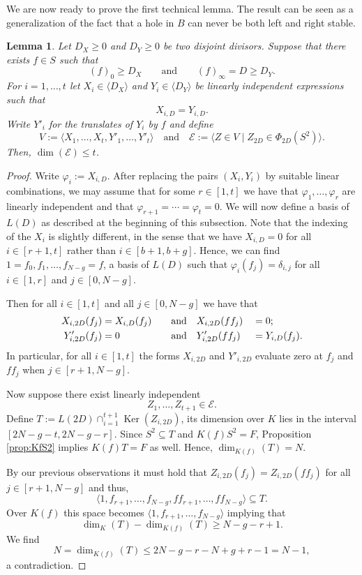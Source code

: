 \documentclass[12pt]{amsart}
\renewcommand{\leq}{\leqslant}
\renewcommand{\geq}{\geqslant}
\DeclareMathOperator{\Ker}{Ker}
\newtheorem{lemma}[theorem]{Lemma}
\theoremstyle{definition}
\newcommand{\divi}[1]{\langle #1 \rangle}
\begin{document}
	We are now ready to prove the first technical lemma. The result can be seen as a generalization of the fact that a hole in $B$ can never be both left and right stable. 
	
	\begin{lemma}\label{lem:dimt1}
		Let $D_X\ge0$ and $D_Y\ge0$ be two disjoint divisors. Suppose that there exists $f\in S$ such that 
		$$(f)_0\ge D_X \qquad\text{and}\qquad (f)_\infty=D \ge D_Y .$$ 
		For $i=1,\ldots,t$ let $X_i\in \divi{D_X}$ and $Y_i\in \divi{D_Y}$ be linearly independent expressions such that $$X_{i,D}=Y_{i,D}.$$ Write $Y'_i$ for the translates of $Y_i$ by $f$ and define 
		$$ V:=\langle X_{1},\ldots,X_{t},Y'_{1},\ldots,Y'_{t}\rangle\quad \text{and}\quad \mathcal E:=\langle Z\in V \mid Z_{2D}\in \Phi_{2D}(S^2)\rangle.$$ Then, $\dim (\mathcal E)\le t$. 
	\end{lemma}
	\begin{proof}
		
		Write $\varphi_i := X_{i,D}$. After replacing the pairs $(X_i,Y_i)$ by suitable linear combinations, we may assume that for some $r \in [1, t]$ we have that $\varphi_1,\ldots,\varphi_r$ are linearly independent and that $\varphi_{r+1}=\cdots=\varphi_t=0.$ We will now define a basis of $L(D)$ as described at the beginning of this subsection. Note that the indexing of the $X_i$ is slightly different, in the sense that we have $X_{i, D} = 0$ for all $i \in [r+1, t]$ rather than $i \in [b+1, b+g]$. Hence, we can find $1 = f_0, f_1, \ldots, f_{N-g} = f$, a basis of $L(D)$ such that $\varphi_i(f_j) = \delta_{i, j}$ for all $i \in [1, r]$ and $j \in [0, N-g]$. 
		
		Then for all $i \in [1, t]$ and all $j \in [0, N-g]$ we have that
		\begin{alignat*}{3}
			X_{i,2D}(f_j) &= X_{i,D}(f_j) &&\quad \textup{and}\quad X_{i,2D}(ff_j) &&= 0;\\
			Y'_{i,2D}(f_j) &= 0 &&\quad \textup{and}\quad Y'_{i,2D}(ff_j) &&= Y_{i,D}(f_j).
		\end{alignat*}
		In particular, for all $i \in [1, t]$ the forms $X_{i,2D}$ and $Y'_{i,2D}$ evaluate zero at $f_j$ and $ff_j$ when $j\in[r+1,N-g]$.
		
		Now suppose there exist linearly independent 
		$$Z_1, \ldots, Z_{t+1} \in \mathcal E.$$ 
		Define $T := L(2D)\cap_{i=1}^{t+1} \Ker(Z_{i, 2D})$, its dimension over $K$ lies in the interval $[2N - g - t, 2N - g - r]$. Since $S^2 \subseteq T$ and $K(f)S^2 = F$, Proposition \ref{prop:KfS2} implies $K(f)T = F$ as well. Hence, $\dim_{K(f)}(T) = N$. 
		
		By our previous observations it must hold that $Z_{i, 2D}(f_j) = Z_{i, 2D}(ff_j)$ for all $ j \in [r+1, N-g]$ and thus,
		$$\langle 1, f_{r+1}, \ldots, f_{N-g}, ff_{r+1}, \ldots, ff_{N-g} \rangle \subseteq T.$$ 
		Over $K(f)$ this space becomes $\langle 1, f_{r+1}, \ldots, f_{N-g} \rangle$ implying that 
		$$\dim_K(T) - \dim_{K(f)}(T) \geq N - g - r + 1.$$ 
		We find
		$$N = \dim_{K(f)} (T) \leq 2N - g - r - N + g + r -1 = N - 1,$$
		a contradiction. 
	\end{proof}
	
\end{document}
